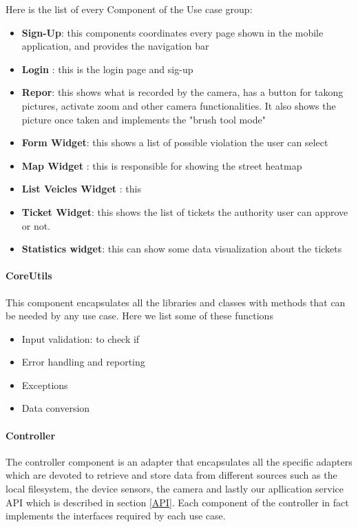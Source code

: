 Here is the list of every Component of the Use case group:
\begin{itemize}
  \item \textbf{Sign-Up}: this components coordinates every page shown in the mobile application, and provides the navigation bar
  \item \textbf{Login } : this is the login page and sig-up
  \item \textbf{Repor}: this shows what is recorded by the camera, has a button for takong pictures, activate zoom and other camera functionalities. It also shows the picture once taken and implements the "brush tool mode"
  \item \textbf{Form Widget}: this shows a list of possible violation the user can select
  \item \textbf{Map Widget} : this is responsible for showing the street heatmap
  \item \textbf{List Veicles Widget} : this
  \item \textbf{Ticket Widget}: this shows the list of tickets the authority user can approve or not.
  \item \textbf{Statistics widget}: this can show some data visualization about the tickets

\end{itemize}


\paragraph{CoreUtils}
This component encapsulates all the libraries and classes with methods that can be needed by any use case.
Here we list some of these functions
\begin{itemize}
  \item Input validation: to check if
  \item Error handling and reporting
  \item Exceptions
  \item Data conversion
\end{itemize}

\paragraph{Controller}

The controller component is an adapter that encapsulates all the specific adapters which are devoted to retrieve and store data from different sources such as the local filesystem, the device sensors, the camera and lastly our apllication service API which is described in section \ref{API}.
Each component of the controller in fact implements the interfaces required by each use case.


